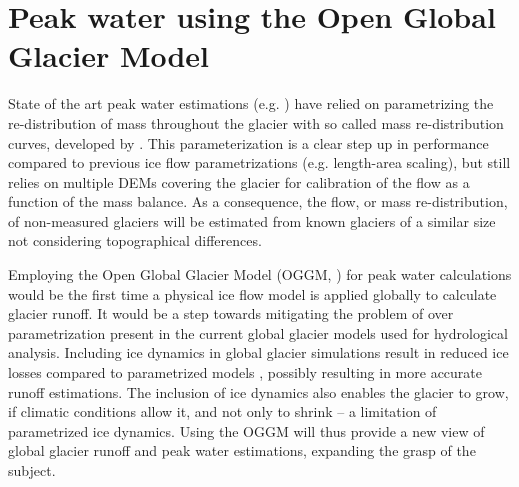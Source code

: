 \documentclass[12pt, a4paper]{article}
\begin{document}
\section{Peak water using the Open Global Glacier Model}
State of the art peak water estimations (e.g.
\cite{rounceGlacierMassChange2020,hussGlobalscaleHydrologicalResponse2018}) have
relied on parametrizing the re-distribution of mass throughout the glacier with
so called mass re-distribution curves, developed by
\textcite{hussFutureHighmountainHydrology2010}. This parameterization is a clear
step up in performance compared to previous ice flow parametrizations (e.g.
length-area scaling), but still relies on multiple DEMs covering the glacier for
calibration of the flow as a function of the mass balance. As a consequence, the
flow, or mass re-distribution, of non-measured glaciers will be estimated from
known glaciers of a similar size not considering topographical differences. 

Employing the Open Global Glacier Model (OGGM,
\cite{maussionOpenGlobalGlacier2019}) for peak water calculations would be the
first time a physical ice flow model is applied globally to calculate glacier
runoff. It would be a step towards mitigating the problem of over
parametrization present in the current global glacier models used for
hydrological analysis. Including ice dynamics in global glacier simulations
result in reduced ice losses compared to parametrized models
\parencite{zekollariModellingFutureEvolution2019}, possibly resulting in
more accurate runoff estimations. The inclusion of ice dynamics also enables the
glacier to grow, if climatic conditions allow it, and not only to shrink -- a
limitation of parametrized ice dynamics. Using the OGGM will thus provide a new
view of global glacier runoff and peak water estimations, expanding the
grasp of the subject.

\end{document}

